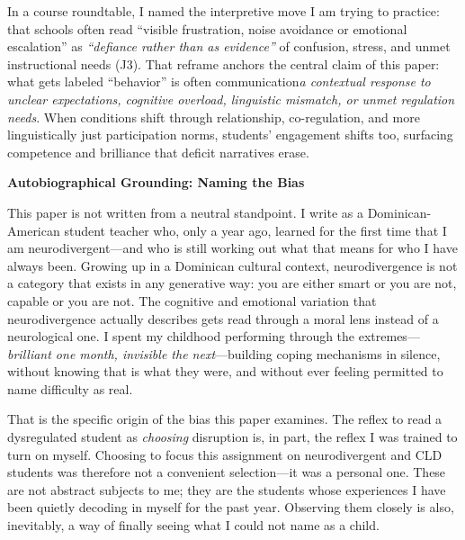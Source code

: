 \documentclass[12pt]{article}
\newcommand{\apaheading}[1]{\begin{center}\textbf{#1}\end{center}}
\newcommand{\JournalArtifact}[1]{\textsc{J#1}}
\begin{document}
In a course roundtable, I named the interpretive move I am trying to practice: that schools often read ``visible frustration, noise avoidance or emotional escalation'' as \textit{``defiance rather than as evidence''} of confusion, stress, and unmet instructional needs (\JournalArtifact{3}). That reframe anchors the central claim of this paper: what gets labeled ``behavior'' is often communication\textemdash{}\textit{a contextual response to unclear expectations, cognitive overload, linguistic mismatch, or unmet regulation needs}. When conditions shift through relationship, co-regulation, and more linguistically just participation norms, students' engagement shifts too, surfacing competence and brilliance that deficit narratives erase.

\newpage
\apaheading{Autobiographical Grounding: Naming the Bias}

This paper is not written from a neutral standpoint. I write as a Dominican-American student teacher who, only a year ago, learned for the first time that I am neurodivergent---and who is still working out what that means for who I have always been. Growing up in a Dominican cultural context, neurodivergence is not a category that exists in any generative way: you are either smart or you are not, capable or you are not. The cognitive and emotional variation that neurodivergence actually describes gets read through a moral lens instead of a neurological one. I spent my childhood performing through the extremes---\textit{brilliant one month, invisible the next}---building coping mechanisms in silence, without knowing that is what they were, and without ever feeling permitted to name difficulty as real.

That is the specific origin of the bias this paper examines. The reflex to read a dysregulated student as \textit{choosing} disruption is, in part, the reflex I was trained to turn on myself. Choosing to focus this assignment on neurodivergent and CLD students was therefore not a convenient selection---it was a personal one. These are not abstract subjects to me; they are the students whose experiences I have been quietly decoding in myself for the past year. Observing them closely is also, inevitably, a way of finally seeing what I could not name as a child.
\end{document}

